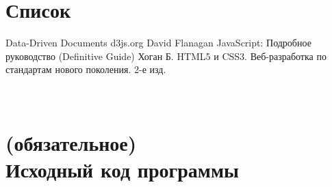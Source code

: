 \documentclass[a4paper,14pt]{extreport}
\begin{document}
\chapter*{Список}
\begin{thebibliography}{9}
 Data-Driven Documents d3js.org
\bibitem{} David Flanagan JavaScript: Подробное руководство (Definitive Guide)
\bibitem{} Хоган Б. HTML5 и CSS3. Веб-разработка по стандартам нового поколения. 2-е изд.
\end{thebibliography}
\newpage
{}
\chapter*{\\(обязательное)\\Исходный код программы\endcenter}
\end{document}
